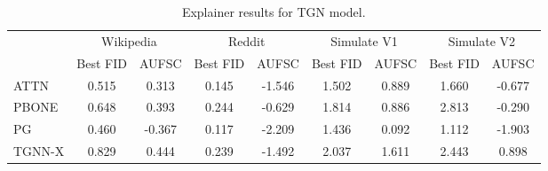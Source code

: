 \begin{table}
\centering
\begin{tabular}{lcccccccc}
\toprule
 & \multicolumn{2}{c}{Wikipedia} & \multicolumn{2}{c}{Reddit} & \multicolumn{2}{c}{Simulate V1} & \multicolumn{2}{c}{Simulate V2} \\
 & Best FID & AUFSC & Best FID & AUFSC & Best FID & AUFSC & Best FID & AUFSC \\
\midrule
ATTN & 0.515 & 0.313 & 0.145 & -1.546 & 1.502 & 0.889 & 1.660 & -0.677 \\
PBONE & 0.648 & 0.393 & 0.244 & -0.629 & 1.814 & 0.886 & 2.813 & -0.290 \\
PG & 0.460 & -0.367 & 0.117 & -2.209 & 1.436 & 0.092 & 1.112 & -1.903 \\
TGNN-X & 0.829 & 0.444 & 0.239 & -1.492 & 2.037 & 1.611 & 2.443 & 0.898 \\
\bottomrule
\end{tabular}
\caption{\label{tab:tgn_results}Explainer results for TGN model.}
\end{table}
